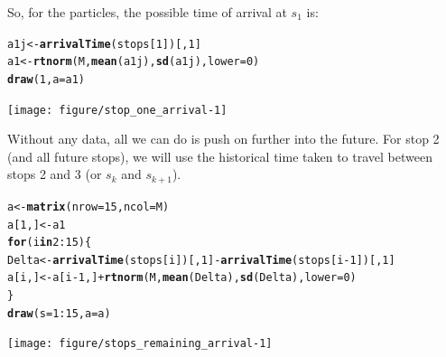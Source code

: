 \documentclass[11pt]{article}\usepackage[]{graphicx}\usepackage[]{color}
\makeatletter
\newcommand{\hlnum}[1]{\textcolor[rgb]{0.686,0.059,0.569}{#1}}%
\newcommand{\hlopt}[1]{\textcolor[rgb]{0,0,0}{#1}}%
\newcommand{\hlstd}[1]{\textcolor[rgb]{0.345,0.345,0.345}{#1}}%
\newcommand{\hlkwa}[1]{\textcolor[rgb]{0.161,0.373,0.58}{\textbf{#1}}}%
\newcommand{\hlkwb}[1]{\textcolor[rgb]{0.69,0.353,0.396}{#1}}%
\newcommand{\hlkwc}[1]{\textcolor[rgb]{0.333,0.667,0.333}{#1}}%
\newcommand{\hlkwd}[1]{\textcolor[rgb]{0.737,0.353,0.396}{\textbf{#1}}}%
\newenvironment{kframe}{%
 \def\at@end@of@kframe{}%
 \ifinner\ifhmode%
  \def\at@end@of@kframe{\end{minipage}}%
  \begin{minipage}{\columnwidth}%
 \fi\fi%
 \def\FrameCommand##1{\hskip\@totalleftmargin \hskip-\fboxsep
 \colorbox{shadecolor}{##1}\hskip-\fboxsep
     \hskip-\linewidth \hskip-\@totalleftmargin \hskip\columnwidth}%
 \MakeFramed {\advance\hsize-\width
   \@totalleftmargin\z@ \linewidth\hsize
   \@setminipage}}%
 {\par\unskip\endMakeFramed%
 \at@end@of@kframe}
\newenvironment{knitrout}{}{} %
\makeatother
\begin{document}
So, for the particles, the possible time of arrival at $s_1$ is:
\begin{knitrout}
\color{fgcolor}\begin{kframe}
\begin{alltt}
\hlstd{a1j} \hlkwb{<-} \hlkwd{arrivalTime}\hlstd{(stops[}\hlnum{1}\hlstd{])[,}\hlnum{1}\hlstd{]}
\hlstd{a1} \hlkwb{<-} \hlkwd{rtnorm}\hlstd{(M,} \hlkwd{mean}\hlstd{(a1j),} \hlkwd{sd}\hlstd{(a1j),} \hlkwc{lower} \hlstd{=} \hlnum{0}\hlstd{)}
\hlkwd{draw}\hlstd{(}\hlnum{1}\hlstd{,} \hlkwc{a} \hlstd{= a1)}
\end{alltt}
\end{kframe}
\texttt{[image: figure/stop\_one\_arrival-1]} 

\end{knitrout}

Without any data, all we can do is push on further into the future.
For stop 2 (and all future stops), we will use the historical time taken to travel between
stops 2 and 3 (or $s_k$ and $s_{k+1}$).

\begin{knitrout}
\color{fgcolor}\begin{kframe}
\begin{alltt}
\hlstd{a} \hlkwb{<-} \hlkwd{matrix}\hlstd{(}\hlkwc{nrow} \hlstd{=} \hlnum{15}\hlstd{,} \hlkwc{ncol} \hlstd{= M)}
\hlstd{a[}\hlnum{1}\hlstd{, ]} \hlkwb{<-} \hlstd{a1}
\hlkwa{for} \hlstd{(i} \hlkwa{in} \hlnum{2}\hlopt{:}\hlnum{15}\hlstd{) \{}
    \hlstd{Delta} \hlkwb{<-} \hlkwd{arrivalTime}\hlstd{(stops[i])[,} \hlnum{1}\hlstd{]} \hlopt{-} \hlkwd{arrivalTime}\hlstd{(stops[i} \hlopt{-} \hlnum{1}\hlstd{])[,} \hlnum{1}\hlstd{]}
    \hlstd{a[i, ]} \hlkwb{<-} \hlstd{a[i} \hlopt{-} \hlnum{1}\hlstd{, ]} \hlopt{+} \hlkwd{rtnorm}\hlstd{(M,} \hlkwd{mean}\hlstd{(Delta),} \hlkwd{sd}\hlstd{(Delta),} \hlkwc{lower} \hlstd{=} \hlnum{0}\hlstd{)}
\hlstd{\}}
\hlkwd{draw}\hlstd{(}\hlkwc{s} \hlstd{=} \hlnum{1}\hlopt{:}\hlnum{15}\hlstd{,} \hlkwc{a} \hlstd{= a)}
\end{alltt}
\end{kframe}
\texttt{[image: figure/stops\_remaining\_arrival-1]} 

\end{knitrout}
\end{document}
